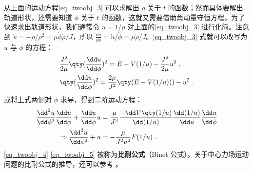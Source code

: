 从上面的运动方程\autoref{eq_twoobj_3} 可以求解出 $\rho$ 关于 $t$ 的函数；然而具体要解出轨道形状，还需要知道 $\phi$ 关于 $t$ 的函数，这就又需要借助角动量守恒方程。为了快速求出轨道形状，我们通常令 $u=1/\rho$ 对上面的\autoref{eq_twoobj_3} 进行化简。注意到 $\dot u=-\dot \rho/\rho^2=\mu\dot \phi\dot \rho/J$，所以 $\frac{\dd u}{\dd \phi}=\dot u/\dot \phi=\mu\dot \rho/J$。\autoref{eq_twoobj_3} 式就可以改写为 $u$ 与 $\phi$ 的方程：
\begin{equation}\label{eq_twoobj_4}
\begin{aligned}
&\frac{J^2}{2\mu} \qty(\frac{\dd u}{\dd \phi})^2=E-V(1/u)-\frac{J^2}{2\mu} u^2~,\\
&\qty(\frac{\dd u}{\dd \phi})^2=\frac{2\mu}{J^2}\qty(E-V(1/u)))-u^2~.
\end{aligned}
\end{equation}
或将上式两侧对 $\phi$ 求导，得到二阶运动方程：
\begin{equation}\label{eq_twoobj_5}
\begin{aligned}
\frac{{\dd}^2 u}{\dd \phi^2}\frac{\dd u}{\dd \phi}+\frac{\dd u}{\dd \phi}u&=\frac{\mu}{J^2}\frac{-\dd V\qty(1/u)}{\dd (1/u)}\frac{\dd (1/u)}{\dd u}\frac{\dd u}{\dd \phi}
\\
\Rightarrow 
\frac{{\dd}^2 u}{\dd \phi^2}+u&=-\frac{\mu}{J^2u^2}F(1/u)~.
\end{aligned}
\end{equation}
\autoref{eq_twoobj_4} \autoref{eq_twoobj_5} 被称为\textbf{比耐公式}（Binet 公式）。关于中心力场运动问题的比耐公式的推导，还可以参考 。

